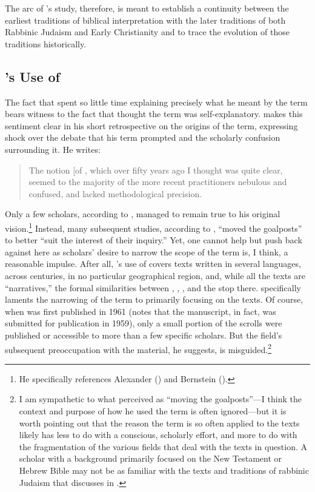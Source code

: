  The arc of \vermes's study, therefore, is meant to establish a continuity between the earliest traditions of biblical interpretation with the later traditions of both Rabbinic Judaism and Early Christianity and to trace the evolution of those traditions historically. 

 \hypertarget{vermess-use-of-rwb}{%
\subsection{\vermes's Use of \RWB}\label{vermess-use-of-rwb}} 

 The fact that \vermes spent so little time explaining precisely what he meant by the term \rwb bears witness to the fact that \vermes thought the term was self-explanatory. \vermes makes this sentiment clear in his short retrospective on the origins of the term, expressing shock over the debate that his term prompted and the scholarly confusion surrounding it. He writes: 

 \begin{quote} The notion {[}of \rwb{]}, which over fifty years ago I thought was quite clear, seemed to the majority of the more recent practitioners nebulous and confused, and lacked methodological precision.\autocite[3]{vermes_zsengeller2014} \end{quote} 

 Only a few scholars, according to \vermes, managed to remain true to his original vision.\footnote{He specifically references   Alexander (\autocite*{alexander_carson-williamson1988}) and Bernstein   (\autocite*{bernstein_textus2005}).} Instead, many subsequent studies, according to \vermes, ``moved the goalposts'' to better ``suit the interest of their inquiry.''\autocite[4]{vermes_zsengeller2014} Yet, one cannot help but push back against \vermes here as scholars' desire to narrow the scope of the term is, I think, a reasonable impulse. After all, \vermes's use of \rwb covers texts written in several languages, across centuries, in no particular geographical region, and, while all the texts are ``narratives,'' the formal similarities between \ga, \ant, \jub, and the \pTarg stop there. \vermes specifically laments the narrowing of the term \rwb to primarily focusing on the \dss texts. Of course, when  was first published in 1961 (\vermes notes that the manuscript, in fact, was submitted for publication in 1959), only a small portion of the scrolls were published or accessible to more than a few specific scholars. But the field's subsequent preoccupation with the \qumran material, he suggests, is misguided.\footnote{I am sympathetic to what   \vermes perceived as ``moving the goalposts''---I   think the context and purpose of how he used the term   \rwb is often ignored---but it is worth pointing out   that the reason the term \rwb is so often applied to   the \qumran texts likely has less to do with a   conscious, scholarly effort, and more to do with the fragmentation of   the various fields that deal with the texts in question. A scholar   with a background primarily focused on the New Testament or Hebrew   Bible may not be as familiar with the texts and traditions of rabbinic   Judaism that \vermes discusses in   .} 

